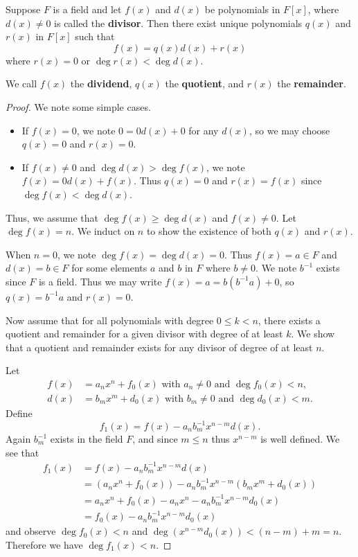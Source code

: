 \begin{theorem}\label{thrm-polynomial-long-division}
    Suppose $F$ is a field and let $f(x)$ and $d(x)$ be polynomials in $F[x]$, where $d(x) \neq 0$ is called the \textbf{divisor}. Then there exist unique polynomials $q(x)$ and $r(x)$ in $F[x]$ such that
    \[
        f(x) = q(x)d(x) + r(x)
    \]
    where $r(x) = 0$ or $\deg r(x) < \deg d(x)$.

    We call $f(x)$ the \textbf{dividend}, $q(x)$ the \textbf{quotient}, and $r(x)$ the \textbf{remainder}.
\end{theorem}
\begin{proof}
    We note some simple cases.
    \begin{itemize}
        \item If $f(x) = 0$, we note $0 = 0d(x) + 0$ for any $d(x)$, so we may choose $q(x) = 0$ and $r(x) = 0$.
        \item If $f(x) \neq 0$ and $\deg d(x) > \deg f(x)$, we note $f(x) = 0d(x) + f(x)$. Thus $q(x) = 0$ and $r(x) = f(x)$ since $\deg f(x) < \deg d(x)$.
    \end{itemize}

    Thus, we assume that $\deg f(x) \geq \deg d(x)$ and $f(x) \neq 0$. Let $\deg f(x) = n$. We induct on $n$ to show the existence of both $q(x)$ and $r(x)$.

    When $n = 0$, we note $\deg f(x) = \deg d(x) = 0$. Thus $f(x) = a \in F$ and $d(x) = b \in F$ for some elements $a$ and $b$ in $F$ where $b \neq 0$. We note $b^{-1}$ exists since $F$ is a field. Thus we may write $f(x) = a = b(b^{-1}a) + 0$, so $q(x) = b^{-1}a$ and $r(x) = 0$.

    Now assume that for all polynomials with degree $0 \leq k < n$, there exists a quotient and remainder for a given divisor with degree of at least $k$. We show that a quotient and remainder exists for any divisor of degree of at least $n$.

    Let
    \begin{align*}
        f(x) &= a_nx^n + f_0(x) \text{ with } a_n \neq 0 \text{ and } \deg f_0(x) < n,\\
        d(x) &= b_mx^m + d_0(x) \text{ with } b_m \neq 0 \text{ and } \deg d_0(x) < m.
    \end{align*}
    Define
    \[
        f_1(x) = f(x) - a_nb_m^{-1}x^{n-m}d(x).
    \]
    Again $b_m^{-1}$ exists in the field $F$, and since $m \leq n$ thus $x^{n-m}$ is well defined. We see that
    \begin{align*}
        f_1(x) &= f(x) - a_nb_m^{-1}x^{n-m}d(x)\\
        &= (a_nx^n + f_0(x)) - a_nb_m^{-1}x^{n-m}\left(b_mx^m + d_0(x)\right)\\
        &= a_nx^n + f_0(x) - a_nx^n - a_nb_m^{-1}x^{n-m}d_0(x)\\
        &= f_0(x) - a_nb_m^{-1}x^{n-m}d_0(x)
    \end{align*}
    and observe $\deg f_0(x) < n$ and $\deg(x^{n-m}d_0(x)) < (n-m) + m = n$. Therefore we have $\deg f_1(x) < n$.


\end{proof}

